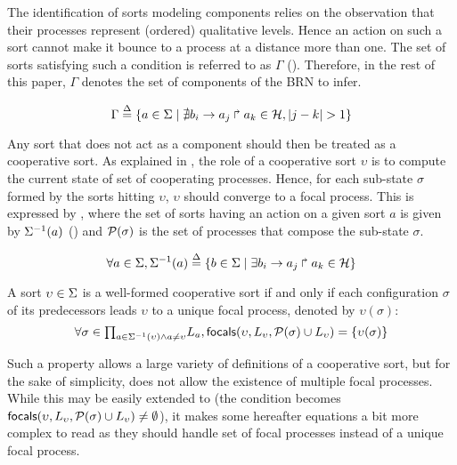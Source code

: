 The identification of sorts modeling components relies on the observation that their processes
represent (ordered) qualitative levels.
Hence an action on such a sort cannot make it bounce to a process at a distance more than one.
The set of sorts satisfying such a condition is referred to as $\Gamma$
().
Therefore, in the rest of this paper, $\Gamma$ denotes the set of components of the BRN to infer.

\begin{equation}
\Gamma \stackrel{\Delta}= \{a \in \Sigma \mid \nexists b_i\rightarrow a_j\Rsh a_k \in \mathcal{H}, |j - k| > 1\} \\
\label{eq:PH-components}
\end{equation}

Any sort that does not act as a component should then be treated as a cooperative sort.
As explained in , the role of a cooperative sort $\upsilon$ is to compute the current
state of set of cooperating processes.
Hence, for each sub-state $\sigma$ formed by the sorts hitting $\upsilon$, $\upsilon$ should
converge to a focal process.
This is expressed by , where
the set of sorts having an action on a given sort $a$ is given by 
$\Sigma^{-1}(a)$ ()
and $\mathcal{P}(\sigma)$ is the set of processes that compose the sub-state $\sigma$.

\begin{equation}
\forall a \in \Sigma, \Sigma^{-1}(a) \stackrel{\Delta}= \{b \in \Sigma \mid \exists b_i\rightarrow a_j\Rsh a_k\in\mathcal{H} \}
\label{eq:ph_direct_predec}
\end{equation}

\begin{property}\label{pro:wf-cooperative-sort}
A sort $\upsilon\in\Sigma$ is a well-formed cooperative sort if and only if
each configuration $\sigma$ of its predecessors leads $\upsilon$ to a unique focal process,
denoted by $\upsilon(\sigma)$:
\[
\forall \sigma \in {\textstyle\prod_{
a\in\Sigma^{-1}(\upsilon) \wedge a\neq \upsilon}}
L_{a},
\mathsf{focals}(\upsilon,L_\upsilon,\mathcal{P}(\sigma)\cup L_\upsilon) = \{ \upsilon(\sigma) \}\]
\end{property}

Such a property allows a large variety of definitions of a cooperative sort, but
for the sake of simplicity, does not allow the existence of multiple focal processes.
While this may be easily extended to (the condition becomes 
$\mathsf{focals}(\upsilon,L_\upsilon, \mathcal{P}(\sigma)\cup L_\upsilon)\neq\emptyset$), it makes some
hereafter equations a bit more complex to read as they should handle set of focal processes instead
of a unique focal process.


